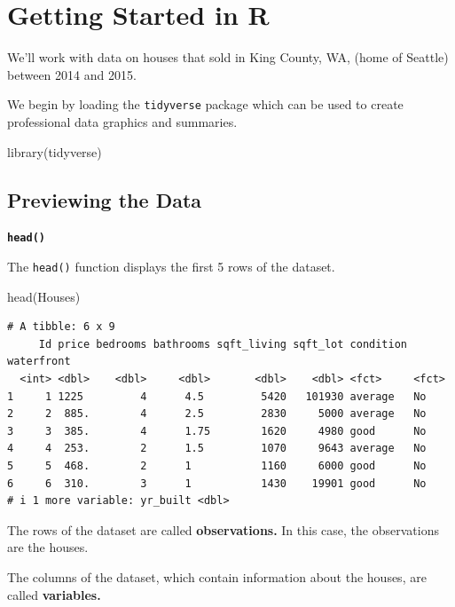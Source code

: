 \documentclass[
  letterpaper,
  DIV=11,
  numbers=noendperiod]{scrreprt}
\newenvironment{Shaded}{\begin{snugshade}}{\end{snugshade}}
\newcommand{\FunctionTok}[1]{\textcolor[rgb]{0.28,0.35,0.67}{#1}}
\newcommand{\NormalTok}[1]{\textcolor[rgb]{0.00,0.23,0.31}{#1}}
\begin{document}
\section{Getting Started in R}\label{getting-started-in-r}

We'll work with data on houses that sold in King County, WA, (home of
Seattle) between 2014 and 2015.

We begin by loading the \texttt{tidyverse} package which can be used to
create professional data graphics and summaries.

\begin{Shaded}
\begin{Highlighting}[]
\FunctionTok{library}\NormalTok{(tidyverse)}
\end{Highlighting}
\end{Shaded}

\subsection{Previewing the Data}\label{previewing-the-data}

\textbf{\texttt{head()}}

The \texttt{head()} function displays the first 5 rows of the dataset.

\begin{Shaded}
\begin{Highlighting}[]
\FunctionTok{head}\NormalTok{(Houses)}
\end{Highlighting}
\end{Shaded}

\begin{verbatim}
# A tibble: 6 x 9
     Id price bedrooms bathrooms sqft_living sqft_lot condition waterfront
  <int> <dbl>    <dbl>     <dbl>       <dbl>    <dbl> <fct>     <fct>     
1     1 1225         4      4.5         5420   101930 average   No        
2     2  885.        4      2.5         2830     5000 average   No        
3     3  385.        4      1.75        1620     4980 good      No        
4     4  253.        2      1.5         1070     9643 average   No        
5     5  468.        2      1           1160     6000 good      No        
6     6  310.        3      1           1430    19901 good      No        
# i 1 more variable: yr_built <dbl>
\end{verbatim}

The rows of the dataset are called \textbf{observations.} In this case,
the observations are the houses.

The columns of the dataset, which contain information about the houses,
are called \textbf{variables.}
\end{document}

